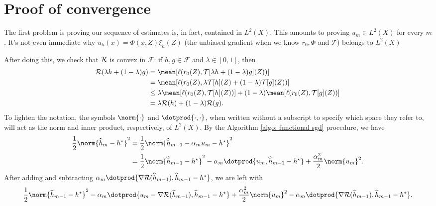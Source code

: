 \section{Proof of convergence}

The first problem is proving our sequence of estimates is, in fact, contained in $ L^{ 2 } ( X ) $.
This amounts to proving $ u_{ m } \in L^{ 2 } ( X ) $ for every $ m $.
It's not even immediate why $ u_{ h } ( x ) = \Phi ( x, Z ) \xi_{ h } ( Z ) $ (the unbiased gradient when we know $ r_{ 0 }, \Phi $ and $ \mathcal{T} $) belongs to $ L^{ 2 } ( X ) $

After doing this, we check that $ \mathcal{R} $ is convex in $ \mathcal{F} $:
if $ h, g \in \mathcal{F} $ and $ \lambda \in [ 0, 1 ] $, then
\begin{align*}
    \risk ( \lambda h + ( 1 - \lambda ) g )
    &= \mean [ \loss ( r_{ 0 } ( Z ), \mathcal{T} [ \lambda h + ( 1 - \lambda ) g ] ( Z ) ) ] \\
    &= \mean [ \loss ( r_{ 0 } ( Z ), \lambda \mathcal{T} [ h ] ( Z ) + ( 1 - \lambda ) \mathcal{T} [ g ] ( Z ) ) ] \\
    &\leq \lambda \mean [ \loss ( r_{ 0 } ( Z ), \mathcal{T} [ h ] ( Z ) ) ] + ( 1 - \lambda ) \mean [ \loss ( r_{ 0 } ( Z ), \mathcal{T} [ g ] ( Z ) ) ] \\
    &= \lambda \risk ( h ) + ( 1 - \lambda ) \risk ( g )
.\end{align*}
To lighten the notation, the symbols $ \norm{ \cdot } $ and $ \dotprod{ \cdot, \cdot } $, when written without a subscript to specify which space they refer to, will act as the norm and inner product, respectively, of $ L^2 ( X ) $.
By the Algorithm \ref{algo: functional sgd} procedure, we have
\begin{align*}
    \frac{ 1 }{ 2 } \norm{ \hat{ h }_{ m } - \hstar }^2
    &= \frac{ 1 }{ 2 } \norm{ \hat{ h }_{ m-1 } - \alpha_{ m } u_{ m } - \hstar }^2 \\
    &= \frac{ 1 }{ 2 } \norm{ \hat{ h }_{ m-1 } - \hstar }^2
    - \alpha_{ m } \dotprod{ u_{ m }, \hat{ h }_{ m-1 } - \hstar }
    + \frac{ \alpha_{ m }^2 }{ 2 } \norm{ u_{ m } }^2
.\end{align*}
After adding and subtracting $ \alpha_{ m } \dotprod{ \nabla \risk ( \hat{ h }_{ m-1 } ), \hat{ h }_{ m-1 } - \hstar } $, we are left with
\begin{equation*}
    \frac{ 1 }{ 2 } \norm{ \hat{ h }_{ m-1 } - \hstar }^2
    - \alpha_{ m } \dotprod{ u_{ m } - \nabla \risk ( \hat{ h }_{ m-1 } ), \hat{ h }_{ m-1 } - \hstar }
    + \frac{ \alpha_{ m }^2 }{ 2 } \norm{ u_{ m } }^2
    - \alpha_{ m } \dotprod{ \nabla \risk ( \hat{ h }_{ m-1 } ), \hat{ h }_{ m-1 } - \hstar }
.\end{equation*}
